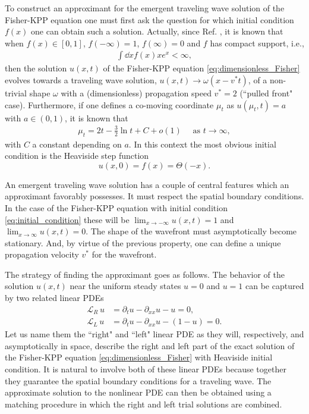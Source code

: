 \documentclass[amsmath,amssymb,amsfonts,aps,pre,preprint,superscriptaddress,showpacs,showkeys,longbibliography,nofootinbib]{revtex4-1}
\begin{document}
To construct an approximant for the emergent traveling wave solution of the Fisher-KPP equation one must first ask the question for which initial condition $f(x)$ one can obtain such a solution. Actually, since Ref. \cite{bramson1983}, it is known that when $f(x)\in[0,1]$, $f(-\infty)=1$, $f(\infty)=0$ and $f$ has compact support, i.e.,
\begin{align}\label{eq:compact support}
\int \dd{x} f(x) x e^{x}<\infty,
\end{align}
then the solution $u(x, t)$ of the Fisher-KPP equation \eqref{eq:dimensionless_Fisher} evolves towards a traveling wave solution, $u(x, t) \to \omega(x - v^* t)$, of a non-trivial shape $\omega$ with a (dimensionless) propagation speed $v^*=2$ (``pulled front" case). Furthermore, if one defines a co-moving coordinate $\mu_t$ as $u(\mu_t, t)=a$ with $a\in(0,1)$, it is known that
\begin{align}
\label{generic}
    \mu_{t}=2 t-\frac{3}{2} \ln t+C+o(1) \quad \text { as } t \rightarrow \infty,
\end{align}
with $C$ a constant depending on $a$. In this context the most obvious initial condition is the Heaviside step function 
\begin{equation}
    \label{eq:initial_condition}
    u(x,0)=f(x)=\Theta(-x).
\end{equation}

An emergent traveling wave solution has a couple of central features which an approximant favorably possesses. It must respect the spatial boundary conditions. In the case of the Fisher-KPP equation with initial condition \eqref{eq:initial_condition} these will be $\lim_{x\rightarrow-\infty}u(x, t)=1$ and $\lim_{x\rightarrow\infty}u(x, t)=0$. The shape of the wavefront must asymptotically become stationary. And, by virtue of the previous property, one can define a unique propagation velocity $v^*$ for the wavefront.

The strategy of finding the approximant goes as follows. The behavior of the solution $u(x,t)$ near the uniform steady states $u=0$ and $u=1$ can be captured by two related linear PDEs
\begin{align}
\label{eq:linear_operator_Right}
    \mathcal{L}_R \, u &= \partial_t u -\partial_{xx}u - u=0,\\
    \mathcal{L}_L \,  u &=\partial_t u -\partial_{xx}u - (1-u)=0.
    \label{eq:linear_operator_Left}
\end{align}
Let us name them the ``right" and ``left" linear PDE as they will, respectively, and asymptotically in space, describe the right and left part of the exact solution of the Fisher-KPP equation \eqref{eq:dimensionless_Fisher} with Heaviside initial condition. It is natural to involve both of these linear PDEs because together they guarantee the spatial boundary conditions for a traveling wave. The approximate solution to the nonlinear PDE can then be obtained using a matching procedure in which the right and left trial solutions are combined.
\end{document}
